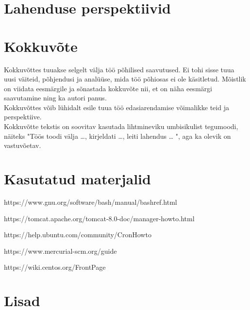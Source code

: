 \documentclass[12pt]{report}
\begin{document}
  \section{Lahenduse perspektiivid}
  
  \newpage
  
  \section*{Kokkuvõte}
  \label{kokkuvote}

Kokkuvõttes tuuakse selgelt välja töö põhilised saavutused. Ei tohi sisse tuua uusi väiteid, põhjendusi ja analüüse, mida töö põhiosas ei ole käsitletud. Mõistlik on viidata eesmärgile ja sõnastada kokkuvõte nii, et on näha eesmärgi saavutamine ning ka autori panus.\\

Kokkuvõttes võib lühidalt esile tuua töö edasiarendamise võimalikke teid ja perspektiive.\\

Kokkuvõtte tekstis on soovitav kasutada lihtmineviku umbisikulist tegumoodi, näiteks "Töös toodi välja …, kirjeldati …, leiti lahendus … ", aga ka olevik on vastuvõetav.

  \newpage
  
  \section*{Kasutatud materjalid}
  \label{kasutatud-materjalid}
  
  https://www.gnu.org/software/bash/manual/bashref.html
  
  https://tomcat.apache.org/tomcat-8.0-doc/manager-howto.html
  
  https://help.ubuntu.com/community/CronHowto
  
  https://www.mercurial-scm.org/guide
  
  https://wiki.centos.org/FrontPage

  \newpage
  
  \section*{Lisad}
  \label{lisad}
\end{document}
